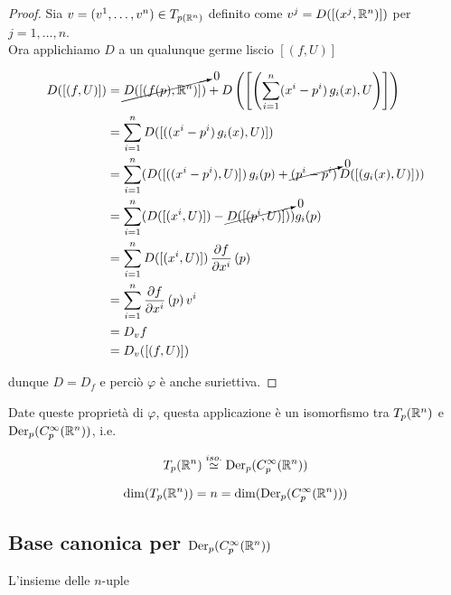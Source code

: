 \begin{proof}
	Sia $ v = (v^{1},\dots,v^{n}) \in T_{p (\mathbb{R}^{n})} $ definito come $ v^{j} = D([(x^{j},\mathbb{R}^{n})]) $ per $ j=1,\dots,n $. \\
	Ora applichiamo $ D $ a un qualunque germe liscio $ [(f,U)] $
	
	\begin{align}
		\begin{split}
			D ([(f,U)]) &= \cancelto{0}{D ([(f(p),\mathbb{R}^{n})])} + D \left(\left[\left( \sum_{i=1}^{n} (x^{i}-p^{i}) \, g_{i}(x) , U \right)\right]\right) \\
			&= \sum_{i=1}^{n} D ([( (x^{i}-p^{i}) \, g_{i}(x) , U )]) \\
			&= \sum_{i=1}^{n} ( D ([( (x^{i}-p^{i}), U )]) \, g_{i}(p) + \cancelto{0}{(p^{i}-p^{i})} \, D ([( g_{i}(x), U )]) ) \\
			&= \sum_{i=1}^{n} ( D ([( x^{i}, U )]) - \cancelto{0}{D ([( p^{i}, U )])} ) g_{i}(p) \\
			&= \sum_{i=1}^{n} D ([( x^{i}, U )]) \, \pdv{f}{x^{i}} \, (p) \\
			&= \sum_{i=1}^{n} \pdv{f}{x^{i}} \, (p) \, v^{i} \\
			&= D_{v} f \\
			&= D_{v} ([(f,U)])
		\end{split}
	\end{align}

	dunque $ D = D_{f} $ e perciò $ \varphi $ è anche suriettiva.
\end{proof}

Date queste proprietà di $ \varphi $, questa applicazione è un isomorfismo tra $ T_{p}(\mathbb{R}^{n}) $ e $ \operatorname{Der}_{p}(C_{p}^{\infty}(\mathbb{R}^{n})) $, i.e.

\begin{equation}
	T_{p}(\mathbb{R}^{n}) \stackrel{iso.}{\simeq} \operatorname{Der}_{p}(C_{p}^{\infty}(\mathbb{R}^{n}))
\end{equation}

\begin{corollary}
	\begin{equation}
		\dim ( T_{p}(\mathbb{R}^{n}) ) = n = \dim ( \operatorname{Der}_{p}(C_{p}^{\infty}(\mathbb{R}^{n})) )
	\end{equation}
\end{corollary}

\subsection{Base canonica per $ \operatorname{Der}_{p}(C_{p}^{\infty}(\mathbb{R}^{n})) $}

L'insieme delle $ n $-uple

